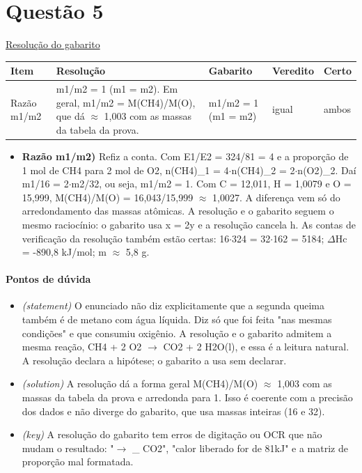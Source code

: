\documentclass{article}%
\begin{document}
\section*{Questão 5}%
\href{https://poliedroresolve.sistemapoliedro.com.br/vestibulares/ime/2026/ime-2-fase-dia-3-25-10-2025-2-fase-dia-3/dissertativa-5-quimica-2-fase-dia-3-ime-2026}{Resolução do gabarito}\par\smallskip%
\begin{longtable}{@{}p{} p{} p{} p{} p{}@{}}\toprule Item & Resolução & Gabarito & Veredito & Certo \\ \midrule
Razão m1/m2 & m1/m2 = 1 (m1 = m2). Em geral, m1/m2 = M(CH4)/M(O), que dá $\approx$ 1,003 com as massas da tabela da prova. & m1/m2 = 1 (m1 = m2) & igual & ambos \\
\bottomrule\end{longtable}%
\begin{itemize}%
\item%
\textbf{Razão m1/m2)} Refiz a conta. Com E1/E2 = 324/81 = 4 e a proporção de 1 mol de CH4 para 2 mol de O2, n(CH4)\_1 = 4$\cdot$n(CH4)\_2 = 2$\cdot$n(O2)\_2. Daí m1/16 = 2$\cdot$m2/32, ou seja, m1/m2 = 1. Com C = 12,011, H = 1,0079 e O = 15,999, M(CH4)/M(O) = 16,043/15,999 $\approx$ 1,0027. A diferença vem só do arredondamento das massas atômicas. A resolução e o gabarito seguem o mesmo raciocínio: o gabarito usa x = 2y e a resolução cancela h. As contas de verificação da resolução também estão certas: 16$\cdot$324 = 32$\cdot$162 = 5184; $\Delta$Hc = -890,8 kJ/mol; m $\approx$ 5,8 g.%
\end{itemize}%
\paragraph{Pontos de dúvida}%
\begin{itemize}%
\item%
\textit{(statement)} O enunciado não diz explicitamente que a segunda queima também é de metano com água líquida. Diz só que foi feita "nas mesmas condições" e que consumiu oxigênio. A resolução e o gabarito admitem a mesma reação, CH4 + 2 O2 $\to$ CO2 + 2 H2O(l), e essa é a leitura natural. A resolução declara a hipótese; o gabarito a usa sem declarar.%
\item%
\textit{(solution)} A resolução dá a forma geral M(CH4)/M(O) $\approx$ 1,003 com as massas da tabela da prova e arredonda para 1. Isso é coerente com a precisão dos dados e não diverge do gabarito, que usa massas inteiras (16 e 32).%
\item%
\textit{(key)} A resolução do gabarito tem erros de digitação ou OCR que não mudam o resultado: "$\to$ \_ CO2", "calor liberado for de 81kJ" e a matriz de proporção mal formatada.%
\end{itemize}%
\end{document}
